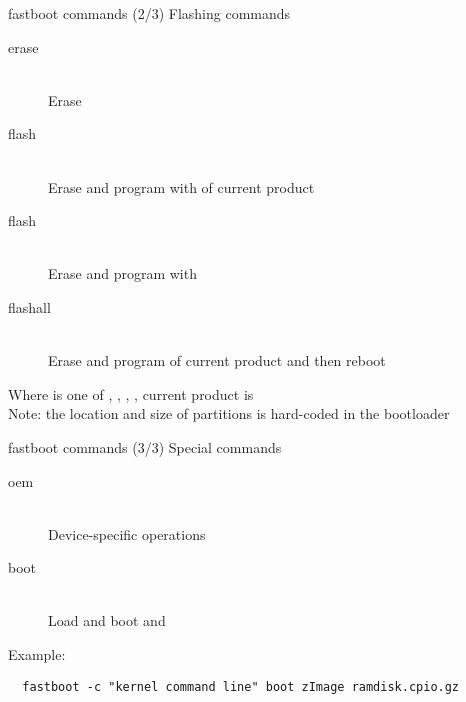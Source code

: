 \begin{frame}{fastboot commands (2/3)}
Flashing commands
\begin{description}
    \item[erase ] \hfill \\
      Erase 
    \item[flash ] \hfill \\
      Erase and program  with 
      of current product
    \item[flash ] \hfill \\
      Erase and program  with 
    \item[flashall\hfill] \hfill \\
      Erase and program 
      of current product and then reboot
  \end{description}
  Where  is one of , ,
  , ,  current product is
   \\
  Note: the location and size of partitions is hard-coded in the
  bootloader
\end{frame}

\begin{frame}[fragile]{fastboot commands (3/3)}
Special commands
  \begin{description}
    \item[oem \hfill] \hfill \\ Device-specific operations
    \item[boot ] \hfill \\
      Load and boot  and 
  \end{description}
  Example:
  \footnotesize
  \begin{verbatim}
  fastboot -c "kernel command line" boot zImage ramdisk.cpio.gz
  \end{verbatim}
  \normalsize
\end{frame}

